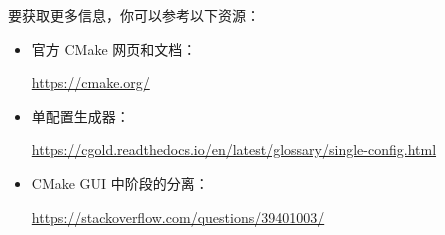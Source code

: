 
要获取更多信息，你可以参考以下资源：


\begin{itemize}
\item
官方 CMake 网页和文档：

\url{https://cmake.org/}

\item
单配置生成器：

\url{https://cgold.readthedocs.io/en/latest/glossary/single-config.html}

\item
CMake GUI 中阶段的分离：

\url{https://stackoverflow.com/questions/39401003/}
\end{itemize}